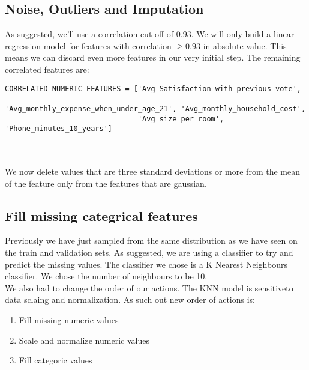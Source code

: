 \documentclass[12pt]{scrartcl}
\begin{document}
\subsection{Noise, Outliers and Imputation}
As suggested, we'll use a correlation cut-off of 0.93. We will only build a linear regression model for features with correlation $\geq 0.93$ in absolute value. This means we can discard even more features in our very initial step. The remaining correlated features are:\\

\begin{adjustbox}{max width=\linewidth}
\begin{lstlisting}
CORRELATED_NUMERIC_FEATURES = ['Avg_Satisfaction_with_previous_vote',
                               'Avg_monthly_expense_when_under_age_21', 'Avg_monthly_household_cost',
                               'Avg_size_per_room', 'Phone_minutes_10_years']
\end{lstlisting}
\end{adjustbox}\\
\\

We now delete values that are three standard deviations or more from the mean of the feature only from the features that are gaussian.

\subsection{Fill missing categrical features}
Previously we have just sampled from the same distribution as we have seen on the train and validation sets. As suggested, we are using a classifier to try and predict the missing values. The classifier we chose is a K Nearest Neighbours classifier. We chose the number of neighbours to be 10.\\
We also had to change the order of our actions. The KNN model is sensitiveto data sclaing and normalization. As such out new order of actions is:
\begin{enumerate}
\item Fill missing numeric values
\item Scale and normalize numeric values
\item Fill categoric values
\end{enumerate}
\end{document}
